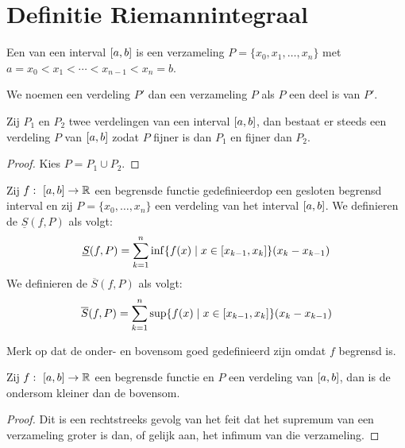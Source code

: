\documentclass[main.tex]{subfiles}
\begin{document}
\section{Definitie Riemannintegraal}
\label{sec:defin-riem}

\begin{de}
  Een  van een interval $\interval{a}{b}$ is een verzameling $P = \{x_{0},x_{1},\dotsc,x_{n}\}$ met $a = x_{0} < x_{1} < \dotsb < x_{n-1} < x_{n} = b$.
\end{de}

\begin{de}
  We noemen een verdeling $P'$  dan een verzameling $P$ als $P$ een deel is van $P'$.
\end{de}

\begin{st}
  Zij $P_{1}$ en $P_{2}$ twee verdelingen van een interval $\interval{a}{b}$, dan bestaat er steeds een verdeling $P$ van $\interval{a}{b}$ zodat $P$ fijner is dan $P_{1}$ en fijner dan $P_{2}$.

  \begin{proof}
    Kies $P = P_{1} \cup P_{2}$.
  \end{proof}
\end{st}

\begin{de}
  Zij $f:\ \interval{a}{b} \rightarrow \mathbb{R}$ een begrensde functie gedefinieerdop een gesloten begrensd interval en zij $P = \{x_{0},\dotsc,x_{n}\}$ een verdeling van het interval $\interval{a}{b}$.
  We definieren de  $\underline{S}(f,P)$ als volgt:
  \[ \underline{S}(f,P) = \sum_{k=1}^{n} \inf\{ f(x) \mid x\in \interval{x_{k-1}}{x_{k}}\} (x_{k}-x_{k-1}) \]
  We definieren de  $\overline{S}(f,P)$ als volgt:  
  \[ \overline{S}(f,P) = \sum_{k=1}^{n} \sup\{ f(x) \mid x\in \interval{x_{k-1}}{x_{k}}\} (x_{k}-x_{k-1}) \]
\end{de}

\begin{opm}
  Merk op dat de onder- en bovensom goed gedefinieerd zijn omdat $f$ begrensd is.
\end{opm}

\begin{bpr}
  Zij $f:\ \interval{a}{b} \rightarrow \mathbb{R}$ een begrensde functie en $P$ een verdeling van $\interval{a}{b}$, dan is de ondersom kleiner dan de bovensom.

  \begin{proof}
    Dit is een rechtstreeks gevolg van het feit dat het supremum van een verzameling groter is dan, of gelijk aan, het infimum van die verzameling.
  \end{proof}
\end{bpr}
\end{document}
